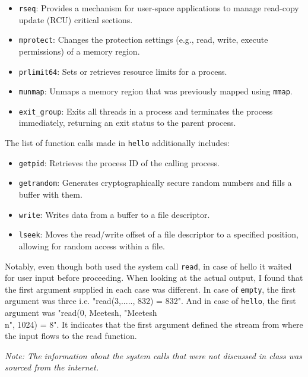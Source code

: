 \documentclass[final,5p,times,authoryear]{elsarticle}
\begin{document}
\begin{itemize}
  \item \texttt{rseq}: Provides a mechanism for user-space applications to manage read-copy update (RCU) critical sections.
  
  \item \texttt{mprotect}: Changes the protection settings (e.g., read, write, execute permissions) of a memory region.
  
  \item \texttt{prlimit64}: Sets or retrieves resource limits for a process.
  
  \item \texttt{munmap}: Unmaps a memory region that was previously mapped using \texttt{mmap}.
  
  \item \texttt{exit\_group}: Exits all threads in a process and terminates the process immediately, returning an exit status to the parent process.
\end{itemize}

The list of function calls made in {\tt hello} additionally includes: 

\begin{itemize}
  \item \texttt{getpid}: Retrieves the process ID of the calling process.
  
  \item \texttt{getrandom}: Generates cryptographically secure random numbers and fills a buffer with them.
  
  \item \texttt{write}: Writes data from a buffer to a file descriptor.
  
  \item \texttt{lseek}: Moves the read/write offset of a file descriptor to a specified position, allowing for random access within a file.
\end{itemize}

Notably, even though both used the system call {\tt read}, in case of hello it waited for user input before proceeding.
When looking at the actual output, I found that the first argument supplied in each case was different.
In case of {\tt empty}, the first argument was three i.e. "read(3,....., 832) = 832".
And in case of {\tt hello}, the first argument was "read(0, Meetesh, "Meetesh\\n", 1024) = 8".
It indicates that the first argument defined the stream from where the input flows to the read function.

{\it Note: The information about the system calls that were not discussed in class was sourced from the internet.}
\end{document}
